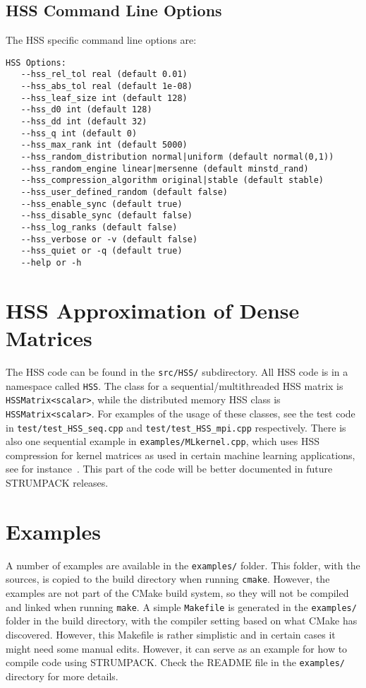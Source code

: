 \documentclass{article}
\begin{document}
\subsection{HSS Command Line Options}
The HSS specific command line options are:
\begin{lstlisting}[style=Bash]
 HSS Options:
   --hss_rel_tol real (default 0.01)
   --hss_abs_tol real (default 1e-08)
   --hss_leaf_size int (default 128)
   --hss_d0 int (default 128)
   --hss_dd int (default 32)
   --hss_q int (default 0)
   --hss_max_rank int (default 5000)
   --hss_random_distribution normal|uniform (default normal(0,1))
   --hss_random_engine linear|mersenne (default minstd_rand)
   --hss_compression_algorithm original|stable (default stable)
   --hss_user_defined_random (default false)
   --hss_enable_sync (default true)
   --hss_disable_sync (default false)
   --hss_log_ranks (default false)
   --hss_verbose or -v (default false)
   --hss_quiet or -q (default true)
   --help or -h
\end{lstlisting}

\section{HSS Approximation of Dense Matrices}
The HSS code can be found in the \lstinline[style=Bash]!src/HSS/!
subdirectory. All HSS code is in a namespace called
\lstinline[style=C]!HSS!. The class for a sequential/multithreaded HSS
matrix is \lstinline[style=C]!HSSMatrix<scalar>!, while the
distributed memory HSS class is
\lstinline[style=C]!HSSMatrix<scalar>!. For examples of the usage of
these classes, see the test code in
\lstinline[style=Bash]!test/test_HSS_seq.cpp! and
\lstinline[style=Bash]!test/test_HSS_mpi.cpp! respectively. There is
also one sequential example in
\lstinline[style=Bash]!examples/MLkernel.cpp!, which uses HSS
compression for kernel matrices as used in certain machine learning
applications, see for instance~\cite{BirosNlogN}. This part of the
code will be better documented in future STRUMPACK releases.


\section{Examples}\label{sec:examples}
A number of examples are available in the
\lstinline[style=Bash]!examples/! folder. This folder, with the
sources, is copied to the build directory when running
\lstinline[style=Bash]!cmake!. However, the examples are not part of
the CMake build system, so they will not be compiled and linked when
running \lstinline[style=Bash]!make!. A simple
\lstinline[style=Bash]!Makefile! is generated in the
\lstinline[style=Bash]!examples/! folder in the build directory, with
the compiler setting based on what CMake has discovered. However, this
Makefile is rather simplistic and in certain cases it might need some
manual edits. However, it can serve as an example for how to compile
code using STRUMPACK. Check the README file in the
\lstinline[style=Bash]!examples/! directory for more details.
\end{document}

